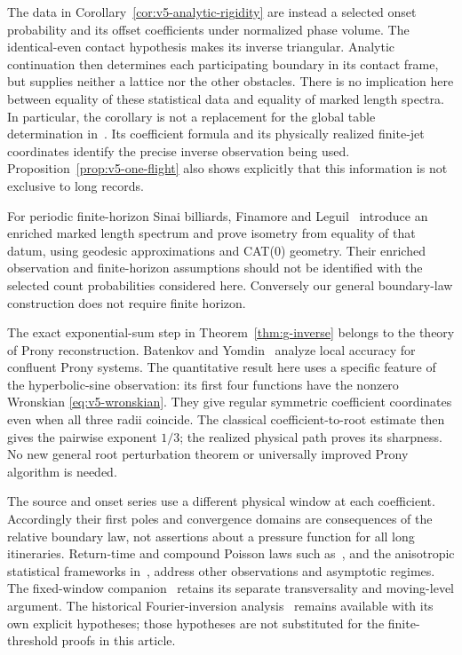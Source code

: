 The data in Corollary~\ref{cor:v5-analytic-rigidity} are instead a selected
onset probability and its offset coefficients under normalized phase
volume. The identical-even contact hypothesis makes its inverse
triangular. Analytic continuation then determines each participating
boundary in its contact frame, but supplies neither a lattice nor the
other obstacles. There is no implication here between equality of these
statistical data and equality of marked length spectra. In particular,
the corollary is not a replacement for the global table determination
in~\cite{DSKL}. Its coefficient formula and its physically realized
finite-jet coordinates identify the precise inverse observation being
used. Proposition~\ref{prop:v5-one-flight} also shows explicitly that
this information is not exclusive to long records.

For periodic finite-horizon Sinai billiards, Finamore and
Leguil~\cite{FinamoreLeguil} introduce an enriched marked length spectrum
and prove isometry from equality of that datum, using geodesic
approximations and CAT(0) geometry. Their enriched observation and
finite-horizon assumptions should not be identified with the selected
count probabilities considered here. Conversely our general boundary-law
construction does not require finite horizon.

The exact exponential-sum step in Theorem~\ref{thm:g-inverse} belongs
to the theory of Prony reconstruction. Batenkov and Yomdin~\cite{BYProny}
analyze local accuracy for confluent Prony systems. The quantitative
result here uses a specific feature of the hyperbolic-sine observation:
its first four functions have the nonzero Wronskian
\eqref{eq:v5-wronskian}. They give regular symmetric coefficient
coordinates even when all three radii coincide. The classical
coefficient-to-root estimate then gives the pairwise exponent $1/3$;
the realized physical path proves its sharpness. No new general root
perturbation theorem or universally improved Prony algorithm is needed.

The source and onset series use a different physical window at each
coefficient. Accordingly their first poles and convergence domains are
consequences of the relative boundary law, not assertions about a
pressure function for all long itineraries. Return-time and compound
Poisson laws such as~\cite{Marklof,CNZ}, and the anisotropic statistical
frameworks in~\cite{DMN,DemersZhang}, address other observations and
asymptotic regimes. The fixed-window companion~\cite{TC} retains its
separate transversality and moving-level argument. The historical
Fourier-inversion analysis~\cite{A2R33} remains available with its own
explicit hypotheses; those hypotheses are not substituted for the
finite-threshold proofs in this article.

